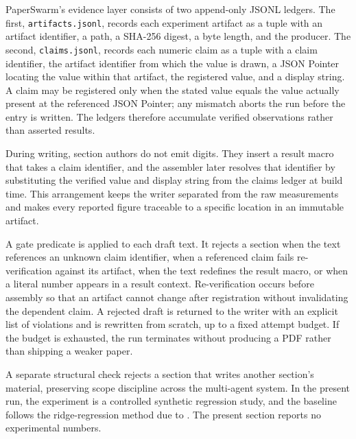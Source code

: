 PaperSwarm's evidence layer consists of two append-only JSONL ledgers. The first, \texttt{artifacts.jsonl}, records each experiment artifact as a tuple with an artifact identifier, a path, a SHA-256 digest, a byte length, and the producer. The second, \texttt{claims.jsonl}, records each numeric claim as a tuple with a claim identifier, the artifact identifier from which the value is drawn, a JSON Pointer locating the value within that artifact, the registered value, and a display string. A claim may be registered only when the stated value equals the value actually present at the referenced JSON Pointer; any mismatch aborts the run before the entry is written. The ledgers therefore accumulate verified observations rather than asserted results.

During writing, section authors do not emit digits. They insert a result macro that takes a claim identifier, and the assembler later resolves that identifier by substituting the verified value and display string from the claims ledger at build time. This arrangement keeps the writer separated from the raw measurements and makes every reported figure traceable to a specific location in an immutable artifact.

A gate predicate is applied to each draft text. It rejects a section when the text references an unknown claim identifier, when a referenced claim fails re-verification against its artifact, when the text redefines the result macro, or when a literal number appears in a result context. Re-verification occurs before assembly so that an artifact cannot change after registration without invalidating the dependent claim. A rejected draft is returned to the writer with an explicit list of violations and is rewritten from scratch, up to a fixed attempt budget. If the budget is exhausted, the run terminates without producing a PDF rather than shipping a weaker paper.

A separate structural check rejects a section that writes another section's material, preserving scope discipline across the multi-agent system. In the present run, the experiment is a controlled synthetic regression study, and the baseline follows the ridge-regression method due to \citet{hoerl1970ridge}. The present section reports no experimental numbers.
